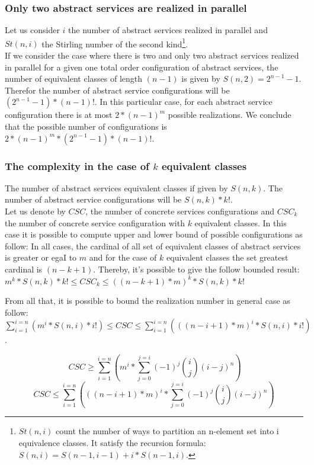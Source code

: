 \documentclass[10pt,journal,compsoc]{IEEEtran}
\begin{document}
\subsubsection{Only two abstract services are realized in parallel}
Let us consider $i$ the number of abstract services realized in parallel and $St(n,i)%
$ the Stirling number of the second kind\footnote{$St(n,i)$ count the number of ways to partition an n-element set into i equivalence classes. It satisfy the recursion formula: $S(n,i)= S(n-1,i-1)+i*S(n-1,i)$.}. \\
If we consider the case where there is two and only two abstract services realized in parallel for a given one total order configuration of abstract services, the number of equivalent classes of length $(n-1)$ is given by $S(n,2)=2^{n-1}-1$. %
 Therefor the number of abstract service configurations will be $(2^{n-1}-1)*(n-1)!$. In this particular case, for each abstract service configuration there is at most $2*(n-1)^m$ possible realizations. We conclude that the possible number of configurations is $2*(n-1)^m*(2^{n-1}-1)*(n-1)!$.
\subsubsection{The complexity in the case of $k$ equivalent classes}
The number of abstract services equivalent classes if given by $S(n,k)$. The number of abstract service configurations will be $S(n,k)*k!$. \\
Let us denote by $CSC$, the number of concrete services configurations and $CSC_k$ the number of concrete service configuration with $k$ equivalent classes.  In this case it is possible to compute upper and lower bound of possible configurations as follow: In all cases, the cardinal of all set of equivalent classes of abstract services is greater or egaI to $m$ and for the case of $k$ equivalent classes the set greatest cardinal is $(n-k+1)$. Thereby, it's possible to give the follow bounded result: $m^k*S(n,k)*k! \leq CSC_k \leq ((n-k+1)*m)^k*S(n,k)*k! $

From all that, it is possible to bound the realization number in general case as follow:
$  \sum_{i=1}^{i=n}  (m^i*S(n,i) *i! ) \leq CSC \leq  \sum_{i=1}^{i=n}  (((n-i+1)*m)^i*S(n,i)*i!)$.

$$\ CSC \geq \sum_{i=1}^{i=n}  (m^i*\sum_{j=0}^{j=i}(-1)^j \binom i j (i-j)^n)$$
$$CSC \leq  \sum_{i=1}^{i=n}  (((n-i+1)*m)^i*\sum_{j=0}^{j=i}(-1)^j \binom i j (i-j)^n) $$
\end{document}
